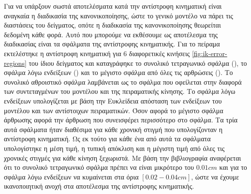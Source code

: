Για να υπάρξουν σωστά αποτελέσματα κατά την αντίστροφη κινηματική είναι αναγκαία η διαδικασία της κανονικοποίησης, ώστε το γενικό μοντέλο να πάρει τις διαστάσεις του δείγματος, οπότε η διαδικασία της κανονικοποίησης θεωρείται δεδομένη κάθε φορά. Αυτό που μπορούμε να εκθέσουμε ως αποτέλεσμα της διαδικασίας είναι τα σφάλματα της αντίστροφης κινηματικής. Για το πείραμα εκτελέστηκε η αντίστροφη κινηματική για 6 διαφορετικές κινήσεις \ref{fig:ik-error-regions} του ίδιου δείγματος και καταγράφηκε το συνολικό τετραγωνικό σφάλμα (), το σφάλμα λόγω ενδείξεων () και το μέγιστο σφάλμα από όλες τις αρθρώσεις (). Το συνολικό αθροιστικό σφάλμα λαμβάνεται ως το σφάλμα που οφείλεται στην διαφορά των συντεταγμένων του μοντέλου και της πειραματικής κίνησης. Το σφάλμα λόγω ενδείξεων υπολογίζεται με βάση την Ευκλείδεια απόσταση των ενδείξεων του μοντέλου και των αντίστοιχων πειραματικών. Όσον αφορά το μέγιστο σφάλμα άρθρωσης αφορά την άρθρωση που συνεισφέρει περισσότερο στο σφάλμα. Τα τρία αυτά σφάλματα ήταν διαθέσιμα για κάθε χρονική στιγμή που υπολογίζονταν η αντίστροφη κινηματική. Ως εκ τούτο για κάθε ένα από αυτά τα σφάλματα υπολογίστηκε η μέση τιμή, η τυπική απόκλιση και η μέγιστη τιμή από όλες τις χρονικές στιγμές για κάθε κίνηση ξεχωριστά. Με βάση την βιβλιογραφία αναφέρεται ότι το συνολικό τετραγωνικό σφάλμα πρέπει να είναι μικρότερο του $0.01cm$ και για το σφάλμα λόγω ενδείξεων να κυμαίνεται στα όρια $[0.02-0.04cm]$, ώστε να έχουμε ικανοποιητική ανοχή στα αποτέλεσμα της αντίστροφης κινηματικής.


